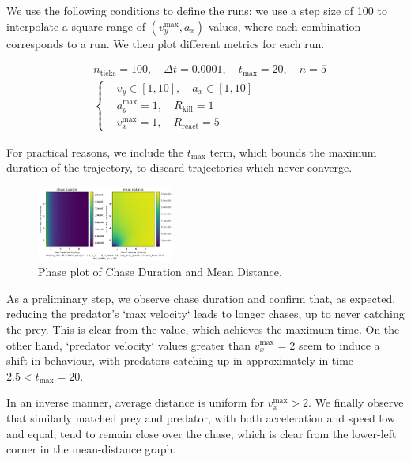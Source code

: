 \documentclass[11pt, twocolumn]{article}
\begin{document}
        We use the following conditions to define the runs: we use a step size of 100 to interpolate a square range of $(v^\text{max}_y, a_x)$ values, where each combination corresponds to a run. We then plot different metrics for each run.

        \[
          \begin{aligned}
            &n_{\text{ticks}} = 100, \quad \Delta t = 0.0001,\quad t_{\text{max}} = 20,\quad n = 5 \\
            &\left\{
              \begin{aligned}
                &v_y \in [1, 10],\quad a_x \in [1, 10] \\
                &a^{\text{max}}_y = 1,\quad R_{\text{kill}} = 1 \\
                &v^{\text{max}}_x = 1,\quad R_{\text{react}} = 5
              \end{aligned}
              \right.
            \end{aligned}
          \]

          For practical reasons, we include the $t_{\text{max}}$ term, which bounds the maximum duration of the trajectory, to discard trajectories which never converge.

          \begin{figure}[H]
            \centering
            \includegraphics[width=0.4\textwidth]{figures/phase_duration_distance.png}
            \caption{Phase plot of Chase Duration and Mean Distance.}
            \label{fig:phaseplot1}
          \end{figure}

          As a preliminary step, we observe chase duration and confirm that, as expected, reducing the predator's `max velocity` leads to longer chases, up to never catching the prey. This is clear from the value, which achieves the maximum time. On the other hand, `predator velocity` values greater than $v_x^{\text{max}}=2$ seem to induce a shift in behaviour, with predators catching up in approximately in time $2.5 < t_{\text{max}} = 20$.

          In an inverse manner, average distance is uniform for $v_x^{\text{max}}>2$. We finally observe that similarly matched prey and predator, with both acceleration and speed low and equal, tend to remain close over the chase, which is clear from the lower-left corner in the mean-distance graph.
\end{document}
